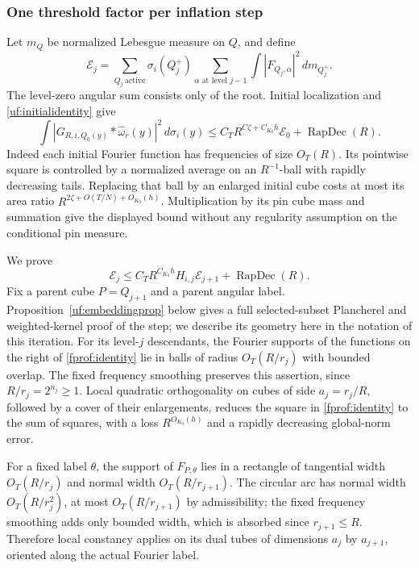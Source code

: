 \subsubsection*{One threshold factor per inflation step}

Let \(m_Q\) be normalized Lebesgue measure on \(Q\), and define
$$
 \mathcal E_j=
 \sum_{Q_j\ \mathrm{active}}\sigma_i(Q_j^+)
 \sum_{\alpha\text{ at level }j-1}
       \int|F_{Q_j,\alpha}|^2\,dm_{Q_j^+}.
$$
The level-zero angular sum consists only of the root. Initial
localization and \eqref{uf:initialidentity} give
$$
 \int|G_{R,i,Q_0(y)}*\widehat\omega_r(y)|^2\,d\sigma_i(y)
 \leq C_T R^{C\zeta+C_{K_0}h}\mathcal E_0
       +\operatorname{RapDec}(R).
$$
Indeed each initial Fourier function has frequencies of size \(O_T(R)\).
Its pointwise square is controlled by a normalized average on an
\(R^{-1}\)-ball with rapidly decreasing tails. Replacing that ball by
an enlarged initial cube costs at most its area ratio
\(R^{2\zeta+O(T/N)+O_{K_0}(h)}\). Multiplication by its pin cube mass
and summation give the displayed bound without any regularity assumption
on the conditional pin measure.

We prove
\begin{equation}\label{fprof:inflation}
 \mathcal E_j\leq C_T R^{C_{K_0}h}H_{i,j}\mathcal E_{j+1}
                   +\operatorname{RapDec}(R).
\end{equation}
Fix a parent cube \(P=Q_{j+1}\) and a parent angular label.
Proposition~\ref{uf:embeddingprop} below gives a full selected-subset
Plancherel and weighted-kernel proof of the step; we describe its geometry
here in the notation of this iteration.
For its level-\(j\) descendants, the Fourier supports of the functions
on the right of \eqref{fprof:identity} lie in balls of radius
\(O_T(R/r_j)\) with bounded overlap. The fixed frequency smoothing
preserves this assertion, since
\(R/r_j=2^{n_j}\geq1\). Local quadratic orthogonality on cubes of
side \(a_j=r_j/R\), followed by a cover of their enlargements, reduces
the square in \eqref{fprof:identity} to the sum of squares, with a loss
\(R^{O_{K_0}(h)}\) and a rapidly decreasing global-norm error.

For a fixed label \(\theta\), the support of
\(F_{P,\theta}\) lies in a rectangle of tangential width
\(O_T(R/r_j)\) and normal width \(O_T(R/r_{j+1})\).
The circular arc has normal width \(O_T(R/r_j^2)\), at most
\(O_T(R/r_{j+1})\) by admissibility; the fixed frequency smoothing
adds only bounded width, which is absorbed since \(r_{j+1}\leq R\).
Therefore local constancy applies on its dual tubes of dimensions
\(a_j\) by \(a_{j+1}\), oriented along the actual Fourier label.

